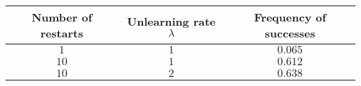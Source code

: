 \begin{tabular}{c c c }
\toprule
Number of restarts & Unlearning rate $\lambda$ & Frequency of successes \\ \midrule
$1$                & $1$                       & $0.065$                \\
$10$               & $1$                       & $0.612$                \\ 
$10$               & $2$                       & $0.638$                \\ \bottomrule
\end{tabular}
